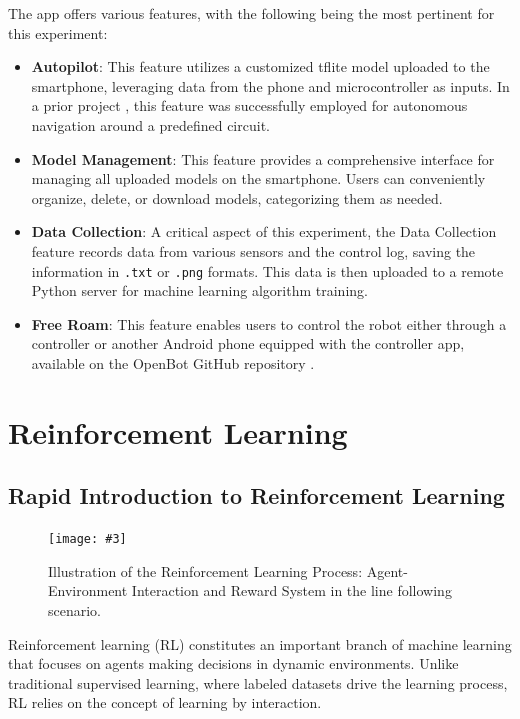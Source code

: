 \documentclass[12pt]{report}
\newcommand\insertfigure[5]{
\begin{figure}[#1]
\begin{center}
\texttt{[image: \#3]}
\end{center}
\caption{#4}
\label{#5}
\end{figure}
}
\begin{document}
The app offers various features, with the following being the most pertinent for this experiment:
\begin{itemize}
    \item \textbf{Autopilot}: This feature utilizes a customized tflite model uploaded to the smartphone, leveraging data from the phone and microcontroller as inputs. In a prior project \cite{bib:openbotLeonLilou}, this feature was successfully employed for autonomous navigation around a predefined circuit.
    \item \textbf{Model Management}: This feature provides a comprehensive interface for managing all uploaded models on the smartphone. Users can conveniently organize, delete, or download models, categorizing them as needed.
    \item \textbf{Data Collection}: A critical aspect of this experiment, the Data Collection feature records data from various sensors and the control log, saving the information in \texttt{.txt} or \texttt{.png} formats. This data is then uploaded to a remote Python server for machine learning algorithm training.
    \item \textbf{Free Roam}: This feature enables users to control the robot either through a controller or another Android phone equipped with the controller app, available on the OpenBot GitHub repository \cite{bib:git_openbot}.
\end{itemize}

\newpage
\section{Reinforcement Learning}
\subsection{Rapid Introduction to Reinforcement Learning}
\label{sub:Rapid_intro_RL}
\insertfigure{th}{0.55\textwidth}{RLOpenbot.png}{Illustration of the Reinforcement Learning Process: Agent-Environment Interaction and Reward System in the line following scenario.}{fig:RLOpenbot}

Reinforcement learning (RL) constitutes an important branch of machine learning that focuses on agents making decisions in dynamic environments. Unlike traditional supervised learning, where labeled datasets drive the learning process, RL relies on the concept of learning by interaction.
\end{document}
